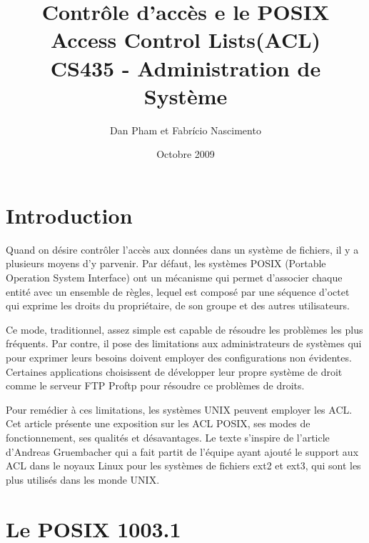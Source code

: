 \usepackage[francais]{babel}
\usepackage[utf8]{inputenc}

\usepackage{graphicx} 

\usepackage{algorithmic}
\usepackage{algorithm}


\title{\textbf{Contrôle d'accès e le POSIX Access Control Lists(ACL)} \\ CS435 - Administration de Système }
\author{Dan Pham et Fabrício Nascimento}
\date{Octobre 2009}



\maketitle
\newpage
\section*{Introduction}
Quand on désire contrôler l'accès aux données dans un système de fichiers, il y a plusieurs moyens d’y parvenir. Par défaut, les systèmes POSIX (Portable Operation System Interface)\cite{ieee1,ieee2} ont un mécanisme qui permet d’associer chaque entité avec un ensemble de règles, lequel est composé par une séquence d'octet qui exprime les droits du propriétaire, de son groupe et des autres utilisateurs.

Ce mode, traditionnel, assez simple est capable de résoudre les problèmes les plus fréquents. Par contre, il pose des limitations aux administrateurs de systèmes qui pour exprimer leurs besoins doivent employer des configurations non évidentes. Certaines applications choisissent de développer leur propre système de droit comme le serveur FTP Proftp\cite{ftp} pour résoudre ce problèmes de droits.

Pour remédier à ces limitations, les systèmes UNIX peuvent employer les ACL. Cet article présente une exposition sur les ACL POSIX, ses modes de fonctionnement, ses qualités et désavantages. Le texte s’inspire de l'article d’Andreas Gruembacher\cite{aclsuse} qui a fait partit de l’équipe ayant ajouté le support aux ACL dans le noyaux Linux pour les systèmes de fichiers ext2 et ext3, qui sont les plus utilisés dans les monde UNIX.
\section{Le POSIX 1003.1}
 
